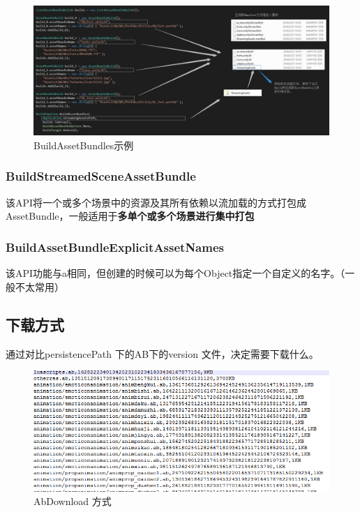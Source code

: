 \documentclass[UTF8,a4paper,12pt]{ctexbook}
\begin{document}
					\begin{figure}[H]
						\centering
						\includegraphics[scale=0.54]{AssetBuild}
						\caption{BuildAssetBundles示例}
					\end{figure}
				
			\subsubsection{BuildStreamedSceneAssetBundle}
				该API将一个或多个场景中的资源及其所有依赖以流加载的方式打包成AssetBundle，一般适用于\textbf{多单个或多个场景进行集中打包}
				
				
			\subsubsection{BuildAssetBundleExplicitAssetNames}
				该API功能与a相同，但创建的时候可以为每个Object指定一个自定义的名字。（一般不太常用）
				
		\subsection{下载方式}
			通过对比persistencePath 下的AB下的version 文件，决定需要下载什么。
			\begin{figure}[H]
				\centering
				\includegraphics[scale=0.45]{AbDownload}
				\caption{AbDownload 方式}
			\end{figure}
		
\end{document}
